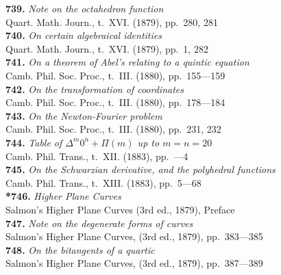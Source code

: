\documentclass[11pt,a4paper]{book}
\begin{document}
\textbf{739.} \textit{Note on the octahedron function} \\
\hspace*{2em}Quart. Math. Journ., t.~XVI. (1879), pp.~280, 281\\[0.3em]
\textbf{740.} \textit{On certain algebraical identities} \\
\hspace*{2em}Quart. Math. Journ., t.~XVI. (1879), pp.~1, 282\\[0.3em]
\textbf{741.} \textit{On a theorem of Abel's relating to a quintic equation} \\
\hspace*{2em}Camb. Phil. Soc. Proc., t.~III. (1880), pp.~155---159\\[0.3em]
\textbf{742.} \textit{On the transformation of coordinates} \\
\hspace*{2em}Camb. Phil. Soc. Proc., t.~III. (1880), pp.~178---184\\[0.3em]
\textbf{743.} \textit{On the Newton-Fourier problem} \\
\hspace*{2em}Camb. Phil. Soc. Proc., t.~III. (1880), pp.~231, 232\\[0.3em]
\textbf{744.} \textit{Table of $\Delta^m 0^n + \Pi(m)$ up to $m=n=20$} \\
\hspace*{2em}Camb. Phil. Trans., t.~XII. (1883), pp.~---4\\[0.3em]
\textbf{745.} \textit{On the Schwarzian derivative, and the polyhedral functions} \\
\hspace*{2em}Camb. Phil. Trans., t.~XIII. (1883), pp.~5---68\\[0.3em]
\textbf{*746.} \textit{Higher Plane Curves} \\
\hspace*{2em}Salmon's Higher Plane Curves (3rd ed., 1879), Preface\\[0.3em]
\textbf{747.} \textit{Note on the degenerate forms of curves} \\
\hspace*{2em}Salmon's Higher Plane Curves, (3rd ed., 1879), pp.~383---385\\[0.3em]
\textbf{748.} \textit{On the bitangents of a quartic} \\
\hspace*{2em}Salmon's Higher Plane Curves, (3rd ed., 1879), pp.~387---389\\[0.3em]
\end{document}
